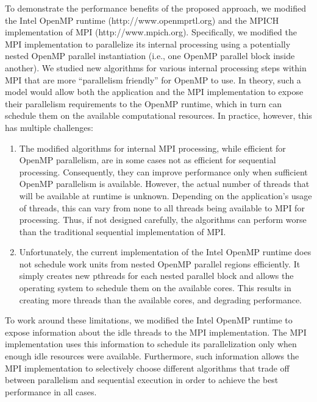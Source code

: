 To demonstrate the performance benefits of the proposed approach, we
modified the Intel OpenMP runtime
(http://\linebreak{}www.openmprtl.org) and the MPICH implementation
of MPI (http://www.mpich.org).  Specifically, we modified the MPI
implementation to parallelize its internal processing using a
potentially nested OpenMP parallel instantiation (i.e., one OpenMP
parallel block inside another).  We studied new algorithms for various
internal processing steps within MPI that are more ``parallelism
friendly'' for OpenMP to use.  In theory, such a model would allow
both the application and the MPI implementation to expose their
parallelism requirements to the OpenMP runtime, which in turn can
schedule them on the available computational resources.  In practice,
however, this has multiple challenges:

\begin{enumerate}
\setlength{\parskip}{-0.2ex}
\vspace{-1.2ex}

\item The modified algorithms for internal MPI processing, while
  efficient for OpenMP parallelism, are in some cases not as efficient
  for sequential processing.  Consequently, they can improve
  performance only when sufficient OpenMP parallelism is available.
  However, the actual number of threads that will be available at
  runtime is unknown.  Depending on the application's usage of
  threads, this can vary from none to all threads being available to
  MPI for processing.  Thus, if not designed carefully, the algorithms
  can perform worse than the traditional sequential implementation of
  MPI.

\item Unfortunately, the current implementation of the Intel OpenMP
  runtime does not schedule work units from nested OpenMP parallel
  regions efficiently.  It simply creates new pthreads for each nested
  parallel block and allows the operating system to schedule them on
  the available cores.  This results in creating more threads than the
  available cores, and degrading performance.

\vspace{-1.2ex}
\end{enumerate}

To work around these limitations, we modified the Intel OpenMP runtime
to expose information about the idle threads to the MPI
implementation.  The MPI implementation uses this information to
schedule its parallelization only when enough idle resources were
available.  Furthermore, such information allows the MPI
implementation to selectively choose different algorithms that trade
off between parallelism and sequential execution in order to achieve
the best performance in all cases.

